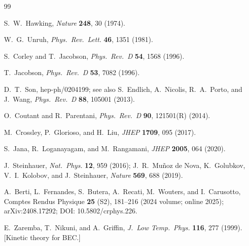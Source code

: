\documentclass[aps,prl,twocolumn,superscriptaddress,nofootinbib,amsmath,amssymb]{revtex4-2}
\begin{document}
\begin{thebibliography}{99}

 S.~W.~Hawking, \textit{Nature} \textbf{248}, 30 (1974).

 W.~G.~Unruh, \textit{Phys.\ Rev.\ Lett.} \textbf{46}, 1351 (1981).

 S.~Corley and T.~Jacobson, \textit{Phys.\ Rev.\ D} \textbf{54}, 1568 (1996).

 T.~Jacobson, \textit{Phys.\ Rev.\ D} \textbf{53}, 7082 (1996).

 D.~T.~Son, hep-ph/0204199; see also S.~Endlich, A.~Nicolis, R.~A.~Porto, and J.~Wang, \textit{Phys.\ Rev.\ D} \textbf{88}, 105001 (2013).

 O.~Coutant and R.~Parentani, \textit{Phys.\ Rev.\ D} \textbf{90}, 121501(R) (2014).

 M.~Crossley, P.~Glorioso, and H.~Liu, \textit{JHEP} \textbf{1709}, 095 (2017).

 S.~Jana, R.~Loganayagam, and M.~Rangamani, \textit{JHEP} \textbf{2005}, 064 (2020).

 J.~Steinhauer, \textit{Nat.\ Phys.} \textbf{12}, 959 (2016); J.~R.~Mu\~noz de Nova, K.~Golubkov, V.~I.~Kolobov, and J.~Steinhauer, \textit{Nature} \textbf{569}, 688 (2019).

 A.~Berti, L.~Fernandes, S.~Butera, A.~Recati, M.~Wouters, and I.~Carusotto, Comptes Rendus Physique \textbf{25} (S2), 181--216 (2024 volume; online 2025); arXiv:2408.17292; DOI: 10.5802/crphys.226.

 E.~Zaremba, T.~Nikuni, and A.~Griffin, \textit{J.\ Low Temp.\ Phys.} \textbf{116}, 277 (1999). [Kinetic theory for BEC.]

\end{thebibliography}
\end{document}
